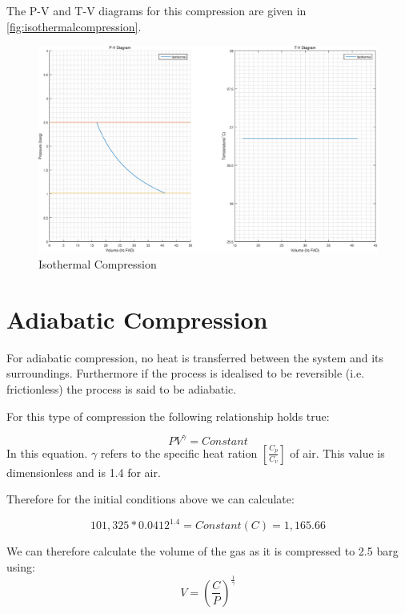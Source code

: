 \documentclass{article}
\begin{document}
The P-V and T-V diagrams for this compression are given in \autoref{fig:isothermalcompression}.

\begin{figure}
\includegraphics[width = \textwidth]{IsothermalCompressionOneStage.eps}
\caption{Isothermal Compression}
\label{fig:isothermalcompression}
\end{figure}

\section{Adiabatic Compression}
For adiabatic compression, no heat is transferred between the system and its surroundings. Furthermore if the process is idealised to be reversible (i.e. frictionless) the process is said to be adiabatic.

For this type of compression the following relationship holds true:

\begin{equation}
PV^{\gamma} = Constant
\end{equation}
In this equation. $\gamma$ refers to the specific heat ration $\left[ \frac{C_{p}}{C_{v}} \right] $ of air. This value is dimensionless and is 1.4 for air.

Therefore for the initial conditions above we can calculate:

\begin{equation}
101,325 * 0.0412^{1.4} = Constant (C) = 1,165.66
\end{equation}

We can therefore calculate the volume of the gas as it is compressed to 2.5 barg using:
\begin{equation}
V = \left( \frac{C}{P} \right) ^{\frac{1}{\gamma}}
\end{equation}
\end{document}
